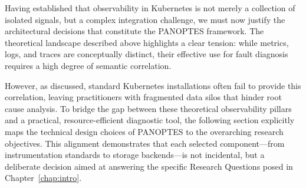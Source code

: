 Having established that observability in Kubernetes is not merely a collection of isolated signals, but a complex integration challenge, we must now justify the architectural decisions that constitute the PANOPTES framework. The theoretical landscape described above highlights a clear tension: while metrics, logs, and traces are conceptually distinct, their effective use for fault diagnosis requires a high degree of semantic correlation. 

However, as discussed, standard Kubernetes installations often fail to provide this correlation, leaving practitioners with fragmented data silos that hinder root cause analysis. To bridge the gap between these theoretical observability pillars and a practical, resource-efficient diagnostic tool, the following section explicitly maps the technical design choices of PANOPTES to the overarching research objectives. This alignment demonstrates that each selected component—from instrumentation standards to storage backends—is not incidental, but a deliberate decision aimed at answering the specific Research Questions posed in Chapter~\ref{chap:intro}.